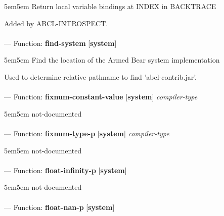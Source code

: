 \begin{adjustwidth}{5em}{5em}
Return local variable bindings at INDEX in BACKTRACE

Added by ABCL-INTROSPECT.
\end{adjustwidth}

\paragraph{}
\label{SYSTEM:FIND-SYSTEM}
--- Function: \textbf{find-system} [\textbf{system}] \textit{}

\begin{adjustwidth}{5em}{5em}
Find the location of the Armed Bear system implementation

Used to determine relative pathname to find 'abcl-contrib.jar'.
\end{adjustwidth}

\paragraph{}
\label{SYSTEM:FIXNUM-CONSTANT-VALUE}
--- Function: \textbf{fixnum-constant-value} [\textbf{system}] \textit{compiler-type}

\begin{adjustwidth}{5em}{5em}
not-documented
\end{adjustwidth}

\paragraph{}
\label{SYSTEM:FIXNUM-TYPE-P}
--- Function: \textbf{fixnum-type-p} [\textbf{system}] \textit{compiler-type}

\begin{adjustwidth}{5em}{5em}
not-documented
\end{adjustwidth}

\paragraph{}
\label{SYSTEM:FLOAT-INFINITY-P}
--- Function: \textbf{float-infinity-p} [\textbf{system}] \textit{}

\begin{adjustwidth}{5em}{5em}
not-documented
\end{adjustwidth}

\paragraph{}
\label{SYSTEM:FLOAT-NAN-P}
--- Function: \textbf{float-nan-p} [\textbf{system}] \textit{}

